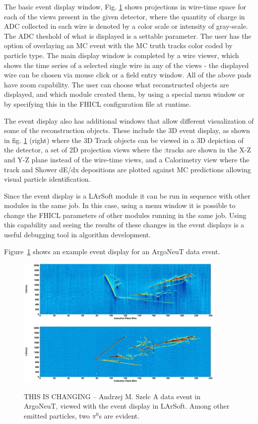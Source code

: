 \documentclass[12pt]{elsarticle}
\begin{document}
{The basic event display window, Fig. \ref{argo.evd} shows projections in wire-time space for each of the views present in the given detector, where the quantity of charge in ADC collected in each wire is denoted by a color scale or intensity of gray-scale. The ADC theshold of what is displayed is a settable parameter. 
The user has the option of overlaying an MC event with the MC truth tracks color coded by particle type. The main display window is completed by a wire viewer, which shows the time series of a selected single wire in any of the views - the displayed wire can be chosen via mouse click or a field entry window.
All of the above pads have zoom capability. The user can choose what reconstructed objects are displayed, and which module created them, by using a special menu window or by specifying this in the FHICL configuration file at runtime. 

The event display also has additional windows that allow different visualization of some of the reconstruction objects. These include the 3D event display, as shown in fig. \ref{argo.evd} (right) where the 3D Track objects can be viewed in a 3D depiction of the detector, a set of 2D projection views where the :tracks are shown in the X-Z and Y-Z plane instead of the wire-time views, and a Calorimetry view where the track and Shower dE/dx depositions are plotted against MC predictions allowing visual particle identification. 

Since the event display is a LArSoft module it can be run in sequence with other modules in the same job. In this case, using a menu window it is possible to change the FHICL parameters of other modules running in the same job. Using this capability and seeing the results of these changes in the event displays is a useful debugging tool in algorithm development.

Figure~\ref{argo.evd} shows an example event display for an ArgoNeuT data event.

\hspace*{2cm}
\begin{figure}[h]
\centering
\caption{THIS IS CHANGING -- Andrzej M. Szelc A data event in ArgoNeuT, viewed with the event display in LArSoft. Among other emitted particles, two $\pi^0$s are evident.}
\includegraphics[width=4.0in]{./imgs/ArgoNeuT_event.jpg}
\label{argo.evd}
\end{figure}

}
\end{document}
